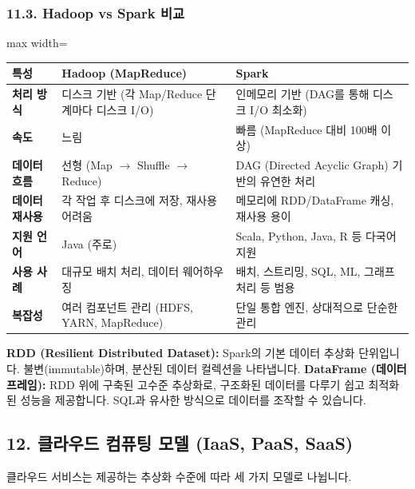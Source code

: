 \documentclass[11pt,a4paper]{article}
\theoremstyle{definition}
\begin{document}
\subsubsection*{11.3. Hadoop vs Spark 비교}

\begin{adjustbox}{max width=\textwidth}
\begin{tabular}{lll}
\toprule
\textbf{특성} & \textbf{Hadoop (MapReduce)} & \textbf{Spark} \\
\midrule
\textbf{처리 방식} & 디스크 기반 (각 Map/Reduce 단계마다 디스크 I/O) & 인메모리 기반 (DAG를 통해 디스크 I/O 최소화) \\
\textbf{속도} & 느림 & 빠름 (MapReduce 대비 100배 이상) \\
\textbf{데이터 흐름} & 선형 (Map $\rightarrow$ Shuffle $\rightarrow$ Reduce) & DAG (Directed Acyclic Graph) 기반의 유연한 처리 \\
\textbf{데이터 재사용} & 각 작업 후 디스크에 저장, 재사용 어려움 & 메모리에 RDD/DataFrame 캐싱, 재사용 용이 \\
\textbf{지원 언어} & Java (주로) & Scala, Python, Java, R 등 다국어 지원 \\
\textbf{사용 사례} & 대규모 배치 처리, 데이터 웨어하우징 & 배치, 스트리밍, SQL, ML, 그래프 처리 등 범용 \\
\textbf{복잡성} & 여러 컴포넌트 관리 (HDFS, YARN, MapReduce) & 단일 통합 엔진, 상대적으로 단순한 관리 \\
\bottomrule
\end{tabular}
\end{adjustbox}

\begin{infobox}
\textbf{RDD (Resilient Distributed Dataset):} Spark의 기본 데이터 추상화 단위입니다. 불변(immutable)하며, 분산된 데이터 컬렉션을 나타냅니다.
\textbf{DataFrame (데이터프레임):} RDD 위에 구축된 고수준 추상화로, 구조화된 데이터를 다루기 쉽고 최적화된 성능을 제공합니다. SQL과 유사한 방식으로 데이터를 조작할 수 있습니다.
\end{infobox}

\subsection*{12. 클라우드 컴퓨팅 모델 (IaaS, PaaS, SaaS)}

클라우드 서비스는 제공하는 추상화 수준에 따라 세 가지 모델로 나뉩니다.
\end{document}
